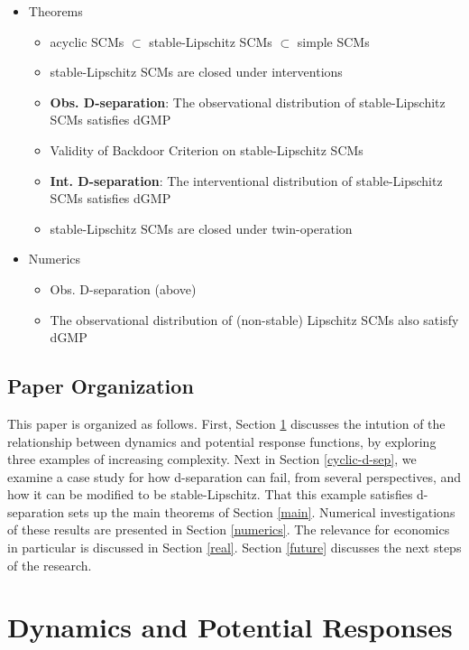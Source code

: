 \documentclass[12pt]{article}
\begin{document}
\begin{itemize}
  \item Theorems
  \begin{itemize}
    \item acyclic SCMs $\subset$ stable-Lipschitz SCMs $\subset$ simple SCMs
    \item stable-Lipschitz SCMs are closed under interventions
    \item \textbf{Obs. D-separation}: The observational distribution of stable-Lipschitz SCMs satisfies dGMP
    \item Validity of Backdoor Criterion on stable-Lipschitz SCMs
    \item \textbf{Int. D-separation}: The interventional distribution of stable-Lipschitz SCMs satisfies dGMP
    \item stable-Lipschitz SCMs are closed under twin-operation

  \end{itemize}
  \item Numerics
  \begin{itemize}
    \item Obs. D-separation (above)
    \item The observational distribution of (non-stable) Lipschitz SCMs also satisfy dGMP
  \end{itemize}
\end{itemize}

\subsection{Paper Organization}
This paper is organized as follows. 
First, Section \ref{intuition} discusses the intution of the relationship between dynamics and potential response functions, by exploring three examples of increasing complexity.
Next in Section \ref{cyclic-d-sep}, we examine a case study for how d-separation can fail, from several perspectives, and how it can be modified to be stable-Lipschitz. 
That this example satisfies d-separation sets up the main theorems of Section \ref{main}.
Numerical investigations of these results are presented in Section \ref{numerics}. The relevance for economics in particular is discussed in Section \ref{real}.
Section \ref{future} discusses the next steps of the research.


\section{Dynamics and Potential Responses}\label{intuition}
\end{document}
